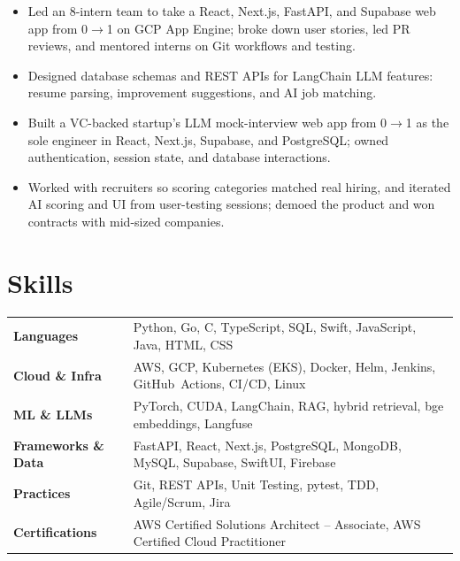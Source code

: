 \documentclass[11pt, letterpaper]{article}
\begin{document}
\vspace{1pt}
\begin{itemize}
  \item Led an 8-intern team to take a React, Next.js, FastAPI, and Supabase web app from 0$\to$1 on GCP App Engine; broke down user stories, led PR reviews, and mentored interns on Git workflows and testing.
  \item Designed database schemas and REST APIs for LangChain LLM features: resume parsing, improvement suggestions, and AI job matching.
\end{itemize}

\vspace{1pt}
\begin{itemize}
  \item Built a VC-backed startup's LLM mock-interview web app from 0$\to$1 as the sole engineer in React, Next.js, Supabase, and PostgreSQL; owned authentication, session state, and database interactions.
  \item Worked with recruiters so scoring categories matched real hiring, and iterated AI scoring and UI from user-testing sessions; demoed the product and won contracts with mid-sized companies.
\end{itemize}

\section{Skills}
\begin{tabularx}{\textwidth}{@{}l @{\hspace{7pt}} >{\raggedright\arraybackslash}X@{}}
  \textbf{Languages} & Python, Go, C, TypeScript, SQL, Swift, JavaScript, Java, HTML, CSS \\[1pt]
  \textbf{Cloud \& Infra} & AWS, GCP, Kubernetes (EKS), Docker, Helm, Jenkins, GitHub~Actions, CI/CD, Linux \\[1pt]
  \textbf{ML \& LLMs} & PyTorch, CUDA, LangChain, RAG, hybrid retrieval, bge embeddings, Langfuse \\[1pt]
  \textbf{Frameworks \& Data} & FastAPI, React, Next.js, PostgreSQL, MongoDB, MySQL, Supabase, SwiftUI, Firebase \\[1pt]
  \textbf{Practices} & Git, REST APIs, Unit Testing, pytest, TDD, Agile/Scrum, Jira \\[1pt]
  \textbf{Certifications} & AWS Certified Solutions Architect -- Associate, AWS Certified Cloud Practitioner \\
\end{tabularx}
\end{document}
